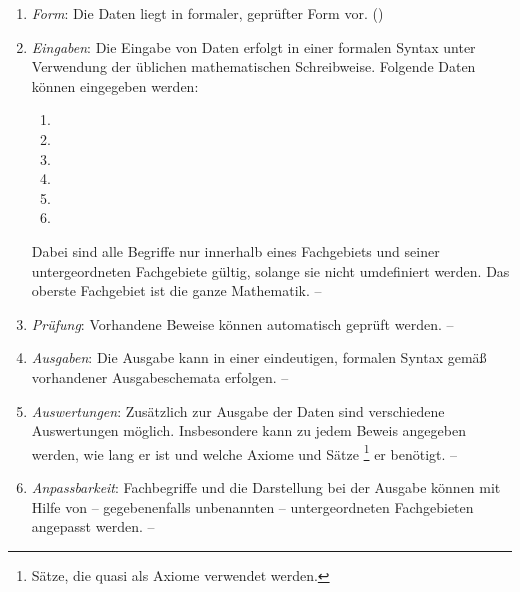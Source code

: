 %
\begin{enumerate}

	\item \label{Anforderung:Form} \emph{Form}:
	Die Daten liegt in formaler, geprüfter Form vor.
	()

	\item \label{Anforderung:Eingaben} \emph{Eingaben}:
	Die Eingabe von Daten erfolgt in einer formalen Syntax unter Verwendung der üblichen mathematischen Schreibweise.
	Folgende Daten können eingegeben werden:
	\begin{enumerate}
		\item {}
		\item {}
		\item {}
		\item {}
		\item {}
		\item {}
	\end{enumerate}
	Dabei sind alle Begriffe nur innerhalb eines Fachgebiets und seiner untergeordneten Fachgebiete gültig, solange sie nicht umdefiniert werden.
	Das oberste Fachgebiet ist die ganze Mathematik.
	-- 

	\item \label{Anforderung:Prüfung} \emph{Prüfung}:
	Vorhandene Beweise können automatisch geprüft werden.
	-- 

	\item \label{Anforderung:Ausgaben} \emph{Ausgaben}:
	Die Ausgabe kann in einer eindeutigen, formalen Syntax gemäß vorhandener Ausgabeschemata erfolgen.
	-- 

	\item \label{Anforderung:Auswertungen} \emph{Auswertungen}:
	Zusätzlich zur Ausgabe der Daten sind verschiedene Auswertungen möglich.
	Insbesondere kann zu jedem Beweis angegeben werden, wie lang er ist und welche Axiome und Sätze%
	\footnote {Sätze, die quasi als Axiome verwendet werden.}
	er benötigt.
	-- 

	\item \label{Anforderung:Anpassbarkeit} \emph{Anpassbarkeit}:
	Fachbegriffe und die Darstellung bei der Ausgabe können mit Hilfe von -- gegebenenfalls unbenannten -- untergeordneten Fachgebieten angepasst werden.
	-- 


\end{enumerate}
